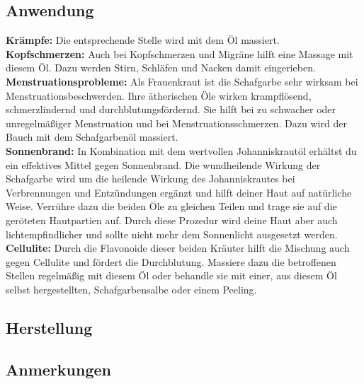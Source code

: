 \subsection{Anwendung}

\textbf{Krämpfe:} Die entsprechende Stelle wird mit dem Öl massiert.\\ 

\textbf{Kopfschmerzen:} Auch bei Kopfschmerzen und Migräne hilft eine Massage mit diesem Öl. Dazu werden Stirn, Schläfen und Nacken damit eingerieben. \\

\textbf{Menstruationsprobleme:} Als Frauenkraut ist die Schafgarbe sehr wirksam bei Menstruationsbeschwerden. Ihre ätherischen Öle wirken krampflösend, schmerzlindernd und durchblutungsfördernd. Sie hilft bei zu schwacher oder unregelmäßiger Menstruation und bei Menstruationsschmerzen. Dazu wird der Bauch mit dem Schafgarbenöl massiert.\\ 

\textbf{Sonnenbrand:} In Kombination mit dem wertvollen Johanniskrautöl erhältst du ein effektives Mittel gegen Sonnenbrand. Die wundheilende Wirkung der Schafgarbe wird um die heilende Wirkung des Johanniskrautes bei Verbrennungen und Entzündungen ergänzt und hilft deiner Haut auf natürliche Weise. Verrühre dazu die beiden Öle zu gleichen Teilen und trage sie auf die geröteten Hautpartien auf. Durch diese Prozedur wird deine Haut aber auch lichtempfindlicher und sollte nicht mehr dem Sonnenlicht ausgesetzt werden.\\ 

\textbf{Cellulite:} Durch die Flavonoide dieser beiden Kräuter hilft die Mischung auch gegen Cellulite und fördert die Durchblutung. Massiere dazu die betroffenen Stellen regelmäßig mit diesem Öl oder behandle sie mit einer, aus diesem Öl selbst hergestellten, Schafgarbensalbe oder einem Peeling. \\


\subsection{Herstellung}


\subsection{Anmerkungen}



\newpage



